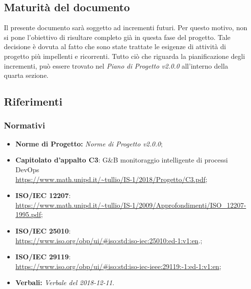 \subsection{Maturità del documento}
Il presente documento sarà soggetto ad incrementi futuri. Per questo motivo, non si pone l'obiettivo di risultare completo già in questa fase del progetto.
Tale decisione è dovuta al fatto che sono state trattate le esigenze di attività di progetto più impellenti e ricorrenti.
Tutto ciò che riguarda la pianificazione degli incrementi, può essere trovato nel \emph{Piano di Progetto v2.0.0} all'interno della quarta sezione.
\subsection{Riferimenti}

\subsubsection{Normativi}
\begin{itemize}
	\item \textbf{Norme di Progetto:} \emph{Norme di Progetto v2.0.0};
	\item \textbf{Capitolato d'appalto C3}: G\&B monitoraggio intelligente di processi DevOps \\
	\url{https://www.math.unipd.it/~tullio/IS-1/2018/Progetto/C3.pdf};
	\item \textbf{ISO/IEC 12207}:\\ \url{https://www.math.unipd.it/~tullio/IS-1/2009/Approfondimenti/ISO_12207-1995.pdf};
	\item \textbf{ISO/IEC 25010}:\\ \url{https://www.iso.org/obp/ui/#iso:std:iso-iec:25010:ed-1:v1:en}.;
	\item \textbf{ISO/IEC 29119}:\\ \url{https://www.iso.org/obp/ui/#iso:std:iso-iec-ieee:29119:-1:ed-1:v1:en};
	\item \textbf{Verbali:} \emph{Verbale del 2018-12-11}.

\end{itemize}
